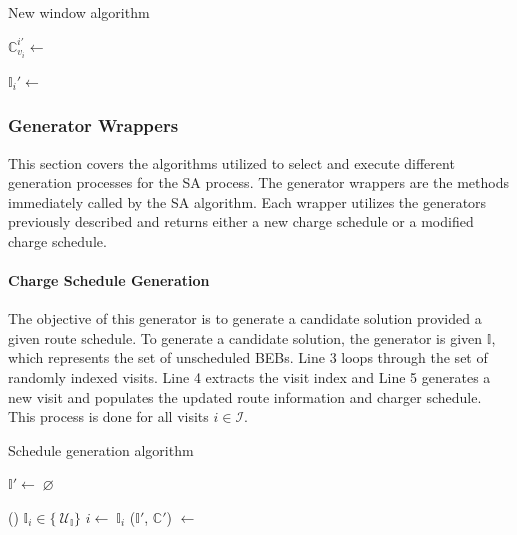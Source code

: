 \documentclass[11pt,a4paper,final]{article}
\newcommand{\I}{\mathbb{I}}                 %
\newcommand{\C}{\mathbb{C}}                 %
\newcommand{\U}{\mathcal{U}}                %
\newcommand{\Sol}{\mathbb{S}}               %
\newcommand{\Iset}{\mathcal{I}}             %
\begin{document}
\begin{algorithm}[H]
\caption{New window algorithm}
    \LinesNumbered
    \KwIn{$\Sol$}
    \KwOut{$\Sol'$}


    \Begin
    {

        $\C_{v_i}^{i'} \leftarrow$ \Purge{$\Sol$} 

        $\I_i' \leftarrow$ \NewVisit{$\Sol'$} 

        \Return{$\Sol' \leftarrow x_i'$} 
    }
\label{alg:new-window}
\end{algorithm}

\subsubsection{Generator Wrappers}
\label{sec:generator-wrappers}
This section covers the algorithms utilized to select and execute different generation processes for the SA process. The
generator wrappers are the methods immediately called by the SA algorithm. Each wrapper utilizes the generators
previously described and returns either a new charge schedule or a modified charge schedule.

\paragraph{Charge Schedule Generation}
\label{sec:charge-schedule-generation}
The objective of this generator is to generate a candidate solution provided a given route schedule. To generate a
candidate solution, the generator is given \(\I\), which represents the set of unscheduled BEBs. Line 3 loops through the
set of randomly indexed visits. Line 4 extracts the visit index and Line 5 generates a new visit and populates the
updated route information and charger schedule. This process is done for all visits \(i \in \Iset\).

\begin{algorithm}[H]
\caption{Schedule generation algorithm} \label{alg:charge-schedule-generation}
    \LinesNumbered
    \KwIn{$\I$, $\C$}
    \KwOut{$\I'$, $\C'$}


    \Begin
    {
        $\I' \leftarrow \; \varnothing$ 

        \ForEach () {$\I_i \in \{\ \U_{\I} \}$}
        {
            $i\leftarrow\; \I_i$ 
            ($\I'$, $\C'$) $\leftarrow$ \NewVisit{($i$, $\I$, $\C$)} 
        }
            \Return{($\I'$, $\C'$)}
    }
\end{algorithm}
\end{document}
